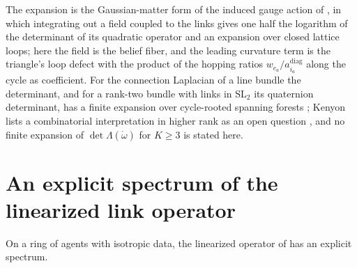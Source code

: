 The expansion is the Gaussian-matter form of the induced gauge action of
\citet[Sec.~2, Eqs.~(2)--(4)]{KazakovMigdal1993}, in which integrating out a field coupled to the links
gives one half the logarithm of the determinant of its quadratic operator and an expansion over closed
lattice loops; here the field is the belief fiber, and the leading curvature term is the triangle's
loop defect with the product of the hopping ratios \(w_{e_a}/a^{\mathrm{diag}}_{i_a}\) along the cycle as
coefficient. For the connection Laplacian of a line bundle the determinant, and for a rank-two bundle
with links in \(\mathrm{SL}_2\) its quaternion determinant, has a finite expansion over cycle-rooted
spanning forests \citep[Theorem~1 and Theorem~9]{Kenyon2011VectorBundleLaplacian}; Kenyon lists a combinatorial
interpretation in higher rank as an open question \citep[Sec.~14]{Kenyon2011VectorBundleLaplacian},
and no finite expansion of \(\det\Lambda(\mathring\omega)\) for \(K\geq3\) is stated here.

\section{An explicit spectrum of the linearized link operator}
\label{sec:glink-spectrum}

On a ring of agents with isotropic data, the linearized operator of
 has an explicit spectrum.

